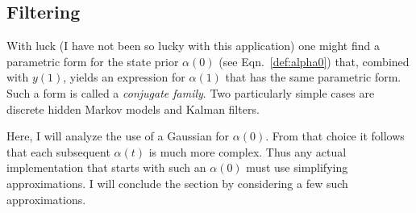 \documentclass[12pt]{article}
\newcommand{\ti}[2]{{#1}{(#2)}}                         %
\begin{document}
\subsection{Filtering}
\label{sec:filter1}

With luck (I have not been so lucky with this application) one might
find a parametric form for the state prior $\alpha(0)$ (see
Eqn.~\eqref{def:alpha0}) that, combined with $\ti{y}{1}$, yields an
expression for $\alpha(1)$ that has the same parametric form.  Such a
form is called a \emph{conjugate family}.  Two particularly simple
cases are discrete hidden Markov models and Kalman filters.

Here, I will analyze the use of a Gaussian for $\alpha(0)$.  From that
choice it follows that each subsequent $\ti{\alpha}{t}$ is much more
complex.  Thus any actual implementation that starts with such an
$\alpha(0)$ must use simplifying approximations.  I will conclude the
section by considering a few such approximations.
\end{document}
